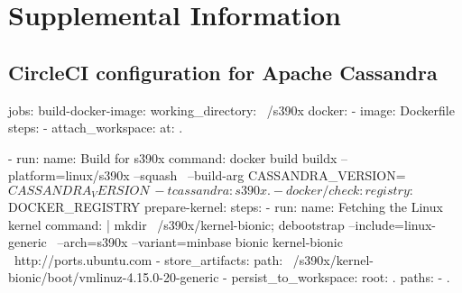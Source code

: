 \chapter{Supplemental Information}\label{app:supplemental-information}

\section{CircleCI configuration for Apache Cassandra}\label{CircleCI}
\begin{boxedverbatim}
jobs:
  build-docker-image:
    working_directory: ~/s390x
    docker:
      - image: Dockerfile
    steps:
      - attach_workspace:
          at: .
      
      - run: 
            name: Build for s390x
            command: docker build buildx --platform=linux/s390x --squash \
                     --build-arg CASSANDRA_VERSION=$CASSANDRA_VERSION \
                     -t cassandra:s390x .
      - docker/check:
         registry: $DOCKER_REGISTRY 
  prepare-kernel:
    steps:
        - run:
              name: Fetching the Linux kernel
              command: |
                      mkdir ~/s390x/kernel-bionic; debootstrap --include=linux-generic \
                      --arch=s390x --variant=minbase bionic kernel-bionic \
                      http://ports.ubuntu.com
        - store_artifacts:
              path: ~/s390x/kernel-bionic/boot/vmlinuz-4.15.0-20-generic
        - persist_to_workspace:
                  root: .
                  paths:
                      - .
        
\end{boxedverbatim}

